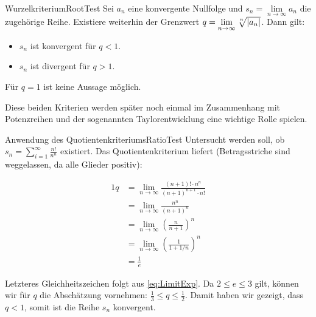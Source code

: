 \begin{statement}{Wurzelkriterium}{RootTest}
    Sei $a_n$ eine konvergente Nullfolge und $s_n = \lim\limits_{n\to\infty} a_n$ die zugehörige Reihe. Existiere weiterhin der Grenzwert $q = \lim\limits_{n\to\infty} \nroot{n}{|a_n|}$. Dann gilt:

    \begin{itemize}
        \item $s_n$ ist konvergent für $q < 1$.
        \item $s_n$ ist divergent für $q > 1$.
    \end{itemize}

    Für $q=1$ ist keine Aussage möglich.
\end{statement}

Diese beiden Kriterien werden später noch einmal im Zusammenhang mit Potenzreihen und der sogenannten Taylorentwicklung eine wichtige Rolle spielen.

\begin{example}{Anwendung des Quotientenkriteriums}{RatioTest}
    Untersucht werden soll, ob $s_n = \sum\limits_{i=1}^\infty \frac{n!}{n^n}$ existiert. Das Quotientenkriterium liefert (Betragsstriche sind weggelassen, da alle Glieder positiv):

    \begin{alignat*}{1}
        q &= \lim\limits_{n\to\infty} \frac{(n+1)! \cdot n^n}{(n+1)^{n+1} \cdot n!} \\
          &= \lim\limits_{n\to\infty} \frac{n^n}{(n+1)^n} \\
          &= \lim\limits_{n\to\infty} \left(\frac{n}{n+1}\right)^n \\
          &= \lim\limits_{n\to\infty} \left( \frac{1}{1+1/n} \right)^n \\
          &= \frac{1}{e}
    \end{alignat*}

    Letzteres Gleichheitszeichen folgt aus \ref{eq:LimitExp}. Da $2\le e \le 3$ gilt, können wir für $q$ die Abschätzung vornehmen: $\frac{1}{3} \le q \le \frac{1}{2}$. Damit haben wir gezeigt, dass $q < 1$, somit ist die Reihe $s_n$ konvergent.
\end{example}
